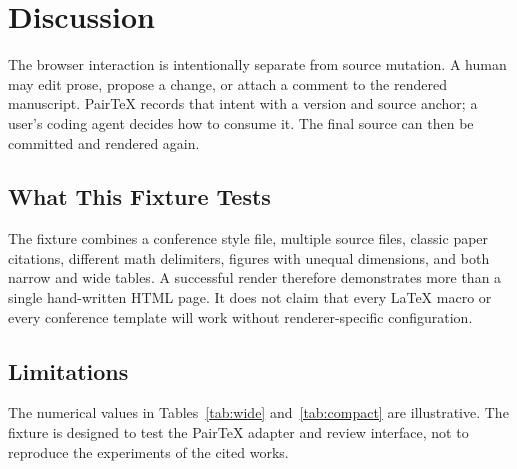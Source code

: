 \section{Discussion}
\label{sec:discussion}

The browser interaction is intentionally separate from source mutation. A
human may edit prose, propose a change, or attach a comment to the rendered
manuscript. PairTeX records that intent with a version and source anchor; a
user's coding agent decides how to consume it. The final source can then be
committed and rendered again.

\subsection{What This Fixture Tests}

The fixture combines a conference style file, multiple source files, classic
paper citations, different math delimiters, figures with unequal dimensions,
and both narrow and wide tables. A successful render therefore demonstrates
more than a single hand-written HTML page. It does not claim that every LaTeX
macro or every conference template will work without renderer-specific
configuration.

\subsection{Limitations}

The numerical values in Tables~\ref{tab:wide} and~\ref{tab:compact} are
illustrative. The fixture is designed to test the PairTeX adapter and review
interface, not to reproduce the experiments of the cited works.

